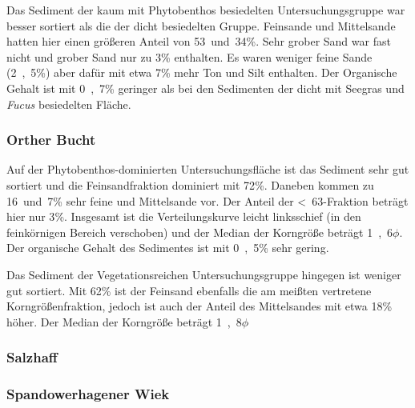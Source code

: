 Das Sediment der kaum mit Phytobenthos besiedelten Untersuchungsgruppe war besser sortiert als die der dicht besiedelten Gruppe. Feinsande und Mittelsande hatten hier einen größeren Anteil von \unit{53 und 34}{\%}. Sehr grober Sand war fast nicht und grober Sand nur zu \unit{3}{\%} enthalten. Es waren weniger feine Sande (\unit{2,5}{\%}) aber dafür mit etwa \unit{7}{\%} mehr Ton und Silt enthalten. Der Organische Gehalt ist mit \unit{0,7}{\%} geringer als bei den Sedimenten der dicht mit Seegras und \textit{Fucus} besiedelten Fläche.



\subsubsection{Orther Bucht}

Auf der Phytobenthos-dominierten Untersuchungsfläche ist das Sediment sehr gut sortiert und die Feinsandfraktion dominiert mit \unit{72}{\%}. Daneben kommen zu \unit{16 und 7}{\%} sehr feine und Mittelsande vor. Der Anteil der \unit{<63}{\mu\metre}-Fraktion beträgt hier nur \unit{3}{\%}. Insgesamt ist die Verteilungskurve leicht linksschief (in den feinkörnigen Bereich verschoben) und der Median der Korngröße beträgt \unit{1,6}{$ \phi $}. Der organische Gehalt des Sedimentes ist mit \unit{0,5}{\%} sehr gering.

Das Sediment der Vegetationsreichen Untersuchungsgruppe hingegen ist weniger gut sortiert. Mit \unit{62}{\%} ist der Feinsand ebenfalls die am meißten vertretene Korngrößenfraktion, jedoch ist auch der Anteil des Mittelsandes mit etwa \unit{18}{\%} höher. Der Median der Korngröße beträgt \unit{1,8}{$ \phi $} 

\subsubsection{Salzhaff}
\subsubsection{Spandowerhagener Wiek}



